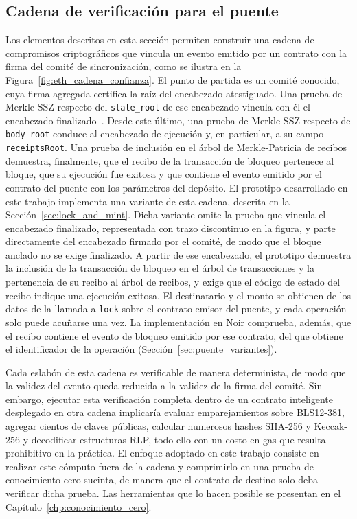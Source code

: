 \subsection{Cadena de verificación para el puente}
\label{sec:eth_cadena_verificacion}

Los elementos descritos en esta sección permiten construir una cadena de compromisos
criptográficos que vincula un evento emitido por un contrato con la firma del comité de
sincronización, como se ilustra en la Figura~\ref{fig:eth_cadena_confianza}. El punto de partida
es un comité conocido, cuya firma agregada certifica la raíz del encabezado atestiguado. Una
prueba de Merkle SSZ respecto del \texttt{state\_root} de ese encabezado vincula con él el
encabezado finalizado~\cite{ethlightclient}. Desde este último, una prueba de Merkle SSZ respecto
de \texttt{body\_root}
conduce al encabezado de ejecución y, en particular, a su campo \texttt{receiptsRoot}. Una prueba
de inclusión en el árbol de Merkle-Patricia de recibos demuestra, finalmente, que el recibo de la
transacción de bloqueo pertenece al bloque, que su ejecución fue exitosa y que contiene el evento
emitido por el contrato del puente con los parámetros del depósito. El prototipo desarrollado en este
trabajo implementa una variante de esta cadena, descrita en la Sección~\ref{sec:lock_and_mint}.
Dicha variante omite la prueba que vincula el encabezado finalizado, representada con trazo
discontinuo en la figura, y parte directamente del encabezado firmado por el comité, de modo que
el bloque anclado no se exige finalizado. A partir de ese encabezado, el prototipo demuestra la
inclusión de la transacción de bloqueo en el árbol de transacciones y la pertenencia de su recibo
al árbol de recibos, y exige que el código de estado del recibo indique una ejecución exitosa. El
destinatario y el monto se obtienen de los datos de la llamada a \texttt{lock} sobre el contrato
emisor del puente, y cada operación solo puede acuñarse una vez. La implementación en Noir
comprueba, además, que el recibo contiene el evento de bloqueo emitido por ese contrato, del que
obtiene el identificador de la operación (Sección~\ref{sec:puente_variantes}).

Cada eslabón de esta cadena es verificable de manera determinista, de modo que la validez del
evento queda reducida a la validez de la firma del comité. Sin embargo, ejecutar esta
verificación completa dentro de un contrato inteligente desplegado en otra cadena implicaría
evaluar emparejamientos sobre BLS12-381, agregar cientos de claves públicas, calcular numerosos
hashes SHA-256 y Keccak-256 y decodificar estructuras RLP, todo ello con un costo en gas que
resulta prohibitivo en la práctica. El enfoque adoptado en este trabajo consiste en realizar
este cómputo fuera de la cadena y comprimirlo en una prueba de conocimiento cero sucinta, de
manera que el contrato de destino solo deba verificar dicha prueba. Las herramientas que lo
hacen posible se presentan en el Capítulo~\ref{chp:conocimiento_cero}.
